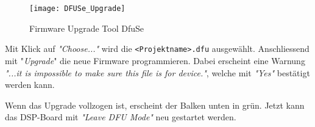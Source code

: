 \begin{figure}[H]
	\centering
	\texttt{[image: DFUSe\_Upgrade]}
	\caption{Firmware Upgrade Tool DfuSe}
	\label{pic:DFUSe_Upgrade}
\end{figure}

Mit Klick auf \textit{"Choose..."} wird die \texttt{<Projektname>.dfu} ausgewählt.
Anschliessend mit "\textit{Upgrade}" die neue Firmware programmieren.
Dabei erscheint eine Warnung \textit{"...it is impossible to make sure this file is for device."}, welche mit \textit{"Yes"} bestätigt werden kann.

Wenn das Upgrade vollzogen ist, erscheint der Balken unten in grün. Jetzt kann das DSP-Board mit \textit{"Leave DFU Mode"} neu gestartet werden.


